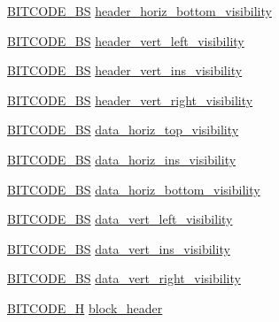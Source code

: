 \begin{DoxyCompactItemize}
\item 
\hyperlink{dwg_8h_a94297606fbd4a4ff97e8add284af0809}{\-B\-I\-T\-C\-O\-D\-E\-\_\-\-B\-S} \hyperlink{struct__dwg__entity__TABLE_abdbe352c465a049bc4618a501654c532}{header\-\_\-horiz\-\_\-bottom\-\_\-visibility}
\item 
\hyperlink{dwg_8h_a94297606fbd4a4ff97e8add284af0809}{\-B\-I\-T\-C\-O\-D\-E\-\_\-\-B\-S} \hyperlink{struct__dwg__entity__TABLE_a7670e4b70385f03d42aaa6701509a4b8}{header\-\_\-vert\-\_\-left\-\_\-visibility}
\item 
\hyperlink{dwg_8h_a94297606fbd4a4ff97e8add284af0809}{\-B\-I\-T\-C\-O\-D\-E\-\_\-\-B\-S} \hyperlink{struct__dwg__entity__TABLE_ad60d2be2fb9338387fb5b219eb7788ac}{header\-\_\-vert\-\_\-ins\-\_\-visibility}
\item 
\hyperlink{dwg_8h_a94297606fbd4a4ff97e8add284af0809}{\-B\-I\-T\-C\-O\-D\-E\-\_\-\-B\-S} \hyperlink{struct__dwg__entity__TABLE_a4a32ba8c61818d350629cd90a205f8be}{header\-\_\-vert\-\_\-right\-\_\-visibility}
\item 
\hyperlink{dwg_8h_a94297606fbd4a4ff97e8add284af0809}{\-B\-I\-T\-C\-O\-D\-E\-\_\-\-B\-S} \hyperlink{struct__dwg__entity__TABLE_aa9cc8905539c1d8a52cc7de081fa268a}{data\-\_\-horiz\-\_\-top\-\_\-visibility}
\item 
\hyperlink{dwg_8h_a94297606fbd4a4ff97e8add284af0809}{\-B\-I\-T\-C\-O\-D\-E\-\_\-\-B\-S} \hyperlink{struct__dwg__entity__TABLE_a0aa47dcb38c4a1a307ad8518aa999796}{data\-\_\-horiz\-\_\-ins\-\_\-visibility}
\item 
\hyperlink{dwg_8h_a94297606fbd4a4ff97e8add284af0809}{\-B\-I\-T\-C\-O\-D\-E\-\_\-\-B\-S} \hyperlink{struct__dwg__entity__TABLE_a41dcea8f23cdc334d5612cb859192326}{data\-\_\-horiz\-\_\-bottom\-\_\-visibility}
\item 
\hyperlink{dwg_8h_a94297606fbd4a4ff97e8add284af0809}{\-B\-I\-T\-C\-O\-D\-E\-\_\-\-B\-S} \hyperlink{struct__dwg__entity__TABLE_ac283c5ab026195287007c2a4973f1d95}{data\-\_\-vert\-\_\-left\-\_\-visibility}
\item 
\hyperlink{dwg_8h_a94297606fbd4a4ff97e8add284af0809}{\-B\-I\-T\-C\-O\-D\-E\-\_\-\-B\-S} \hyperlink{struct__dwg__entity__TABLE_a7e45012251e4d1b08d5dd466289404b6}{data\-\_\-vert\-\_\-ins\-\_\-visibility}
\item 
\hyperlink{dwg_8h_a94297606fbd4a4ff97e8add284af0809}{\-B\-I\-T\-C\-O\-D\-E\-\_\-\-B\-S} \hyperlink{struct__dwg__entity__TABLE_a80a37381bac1e2591fe20414ee7f965c}{data\-\_\-vert\-\_\-right\-\_\-visibility}
\item 
\hyperlink{dwg_8h_a7c700e94e047a97ba8c24bdfe4029dc3}{\-B\-I\-T\-C\-O\-D\-E\-\_\-\-H} \hyperlink{struct__dwg__entity__TABLE_a468f82763c3d3e98c7a0a8ceff16e753}{block\-\_\-header}

\end{DoxyCompactItemize}
